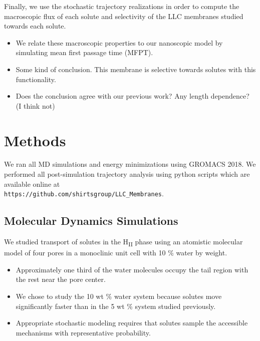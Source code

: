 \documentclass{article}
\begin{document}
  Finally, we use the stochastic trajectory realizations in order to compute the 
  macroscopic flux of each solute and selectivity of the LLC membranes studied towards
  each solute.
  \begin{itemize}
    \item We relate these macroscopic properties to our nanoscopic model by simulating 
    mean first passage time (MFPT).
    \item Some kind of conclusion. This membrane is selective towards solutes with this
    functionality. 
    \item Does the conclusion agree with our previous work? Any length dependence? (I think not)
  \end{itemize}
    
  \section{Methods}
    
  We ran all MD simulations and energy minimizations using GROMACS 2018. We
  performed all post-simulation trajectory analysis using python scripts which are available
  online at \\ \texttt{https://github.com/shirtsgroup/LLC\_Membranes}.

  \subsection{Molecular Dynamics Simulations}
  

  We studied transport of solutes in the H\textsubscript{II} phase using an
  atomistic molecular model of four pores in a monoclinic unit cell with 
  10 \% water by weight. 
  \begin{itemize}
    \item Approximately one third of the water molecules occupy the tail region 
    with the rest near the pore center.
    \item We chose to study the 10 wt \% water system because solutes move 
    significantly faster than in the 5 wt \% system studied previously.
    \item Appropriate stochastic modeling requires that solutes sample the 
    accessible mechanisms with representative probability.%
  \end{itemize}
  
\end{document}
